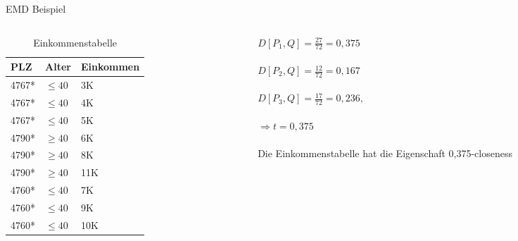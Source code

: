 \begin{frame} {EMD Beispiel}
	
	\begin{columns}[T]
		\begin{column}{0.5\textwidth}
			\begin{table}[]
				\centering
				\label{tclossenessExample}
				\begin{tabular}{|l|l|l|}
					\hline
					\textbf{PLZ}   & \textbf{Alter}    & \textbf{Einkommen} \\\hline
					4767* & $\le 40$ & 3K \\
					4767* & $\le 40$ & 4K \\
					4767* & $\le 40$ & 5K \\\hline
					4790* & $\ge 40$ & 6K \\
					4790* & $\ge 40$ & 8K \\
					4790* & $\ge 40$ & 11K \\\hline
					4760* & $\le 40$ & 7K \\
					4760* & $\le 40$ & 9K \\
					4760* & $\le 40$ & 10K \\\hline
				\end{tabular}
				\caption{Einkommenstabelle}
			\end{table}
		\end{column}
		
		\begin{column}{0.5\textwidth}
			$D[P_1,Q]=\frac{27}{72} = 0,375$\\
			\ \\
			$D[P_2,Q]=\frac{12}{72} = 0,167$\\
			\ \\
			$D[P_3,Q]=\frac{17}{72} = 0,236,$\\
			\ \\
			$\Rightarrow t=0,375$\\
			\ \\
			Die Einkommenstabelle hat die Eigenschaft 0,375-closeness	
		\end{column}
	\end{columns}
\end{frame}
